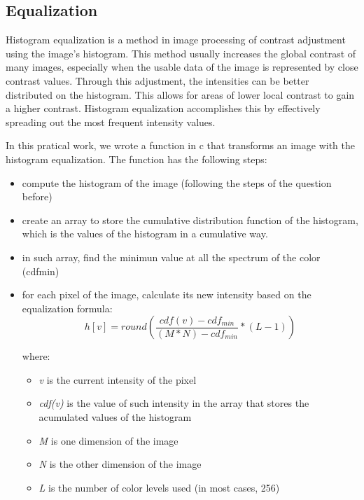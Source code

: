 \documentclass{article}
\begin{document}
	\subsection{Equalization}

	Histogram equalization is a method in image processing of contrast adjustment using the image's histogram. This method usually increases the global contrast 		of many images, especially when the usable data of the image is represented by close contrast values. Through this adjustment, the intensities can be better 		distributed on the histogram. This allows for areas of lower local contrast to gain a higher contrast. Histogram equalization accomplishes this by 		effectively spreading out the most frequent intensity values.

	In this pratical work, we wrote a function in c that transforms an image with the histogram equalization. The function has the following steps:
	\begin{itemize}
  		\item compute the histogram of the image (following the steps of the question before)
  		\item create an array to store the cumulative distribution function of the histogram, which is the values of the histogram in a cumulative way.
  		\item in such array, find the minimun value at all the spectrum of the color (cdfmin)
  		\item for each pixel of the image, calculate its new intensity based on the equalization formula:
			\begin{equation}
				h[v]= round \left( \frac{cdf(v)-cdf_{min}}{(M * N) - cdf_{min}} * (L-1) \right) 
			\label{eq:equalization}
			\end{equation}
			
			where:		
			\begin{itemize}
	  			\item {\it v} is the current intensity of the pixel		
		  		\item {\it cdf(v)} is the value of such intensity in the array that stores the acumulated values of the histogram
		  		\item {\it M} is one dimension of the image		
		  		\item {\it N} is the other dimension of the image
		  		\item {\it L} is the number of color levels used (in most cases, 256)
			\end{itemize}
	\end{itemize}
\end{document}
